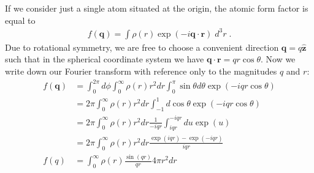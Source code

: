 \documentclass[11pt]{article}
\renewcommand{\vec}[1]{\boldsymbol{#1}}
\newcommand{\hvec}[1]{\hat{\vec{#1}}}
\begin{document}
If we consider just a single atom situated at the origin, the atomic form factor is equal to
\begin{align}
 f(\vec{q})  = \int \rho(r) \exp(-i \vec{q}\cdot\vec{r}) \; d^3r \; .
\end{align}
Due to rotational symmetry, we are free to choose a convenient direction $\vec{q} = q \hvec{z}$ such that in the
spherical coordinate system we have $\vec{q}\cdot\vec{r} =  q r \cos\theta$.  Now we write down our Fourier transform with
reference only to the magnitudes $q$ and $r$:
\begin{align}
f(\vec{q})  &= \int_0^{2\pi} d\phi \int_0^\infty \rho(r) r^2 dr \int_0^\pi \sin\theta d\theta  \exp(-i q r \cos\theta)\\
&=2\pi \int_0^\infty \rho(r) r^2 dr \int_{-1}^1  d\cos\theta  \exp(-i q r \cos\theta)  \\
&=2\pi \int_0^\infty \rho(r) r^2 dr \frac{1}{-iqr}\int_{iqr}^{-iqr}  du  \exp(u)  \\
&=2\pi \int_0^\infty \rho(r) r^2 dr \frac{\exp(iqr) - \exp(-iqr)}{iqr}   \\
f(q) &= \int_0^\infty \rho(r)   \frac{\sin(qr)}{qr}  4\pi r^2 dr  
\end{align}

\newpage



\end{document}
